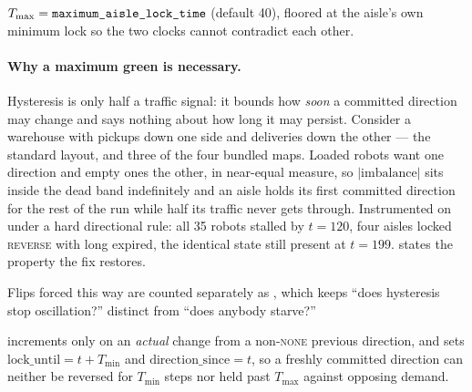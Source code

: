 $T_{\max} = \texttt{maximum\_aisle\_lock\_time}$ (default 40), floored at the
aisle's own minimum lock so the two clocks cannot contradict each other.

\paragraph{Why a maximum green is necessary.} Hysteresis is only half a traffic
signal: it bounds how \emph{soon} a committed direction may change and says
nothing about how long it may persist. Consider a warehouse with pickups down
one side and deliveries down the other --- the standard layout, and three of
the four bundled maps. Loaded robots want one direction and empty ones the
other, in near-equal measure, so $|\mathrm{imbalance}|$ sits inside the dead
band indefinitely and an aisle holds its first committed direction for the rest
of the run while half its traffic never gets through. Instrumented on
 under a hard directional rule: all 35 robots
stalled by $t = 120$, four aisles locked \textsc{reverse} with
 long expired, the identical state still present at
$t = 199$.  states the property the fix restores.

Flips forced this way are counted separately as , which
keeps ``does hysteresis stop oscillation?'' distinct from ``does anybody
starve?''

 increments  only on an \emph{actual}
change from a non-\textsc{none} previous direction, and sets
$\mathrm{lock\_until} = t + T_{\min}$ and $\mathrm{direction\_since} = t$, so a
freshly committed direction can neither be reversed for $T_{\min}$ steps nor
held past $T_{\max}$ against opposing demand.

